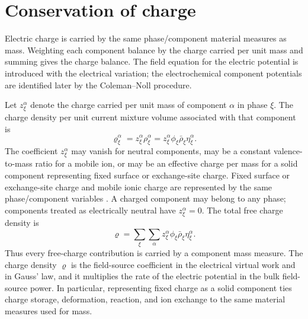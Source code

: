 \section{Conservation of charge}
\label{sec:conservation_of_charge}

Electric charge is carried by the same phase/component material measures as
mass.  Weighting each component balance by the charge carried per unit mass and
summing gives the charge balance.  The field equation for the electric
potential is introduced with the electrical variation; the electrochemical
component potentials are identified later by the Coleman--Noll procedure.

Let \(z_\xi^\alpha\) denote the charge carried per unit mass of component
\(\alpha\) in phase \(\xi\).  The charge density per unit current mixture volume
associated with that component is
%
\begin{equation}
	\varrho_\xi^\alpha
	=
	z_\xi^\alpha\rho_\xi^\alpha
	=
	z_\xi^\alpha\phi_\xi\bar\rho_\xi\eta_\xi^\alpha .
	\label{eq:component_charge_density_definition}
\end{equation}
%
The coefficient \(z_\xi^\alpha\) may vanish for neutral components, may be a
constant valence-to-mass ratio for a mobile ion, or may be an effective charge
per mass for a solid component representing fixed surface or exchange-site
charge.  Fixed surface or exchange-site charge and mobile ionic charge are
represented by the same phase/component variables
\cite{leroy2004triple,newman2004electrochemical}.  A charged component may
belong to any phase; components treated as electrically neutral have
\(z_\xi^\alpha=0\).  The total free charge density is
%
\begin{equation}
	\varrho
	=
	\sum_\xi\sum_\alpha
	z_\xi^\alpha\phi_\xi\bar\rho_\xi\eta_\xi^\alpha.
	\label{eq:mixture_charge_density_definition}
\end{equation}
%
Thus every free-charge contribution is carried by a component mass measure.
The charge density \(\varrho\) is the field-source coefficient in the
electrical virtual work and in Gauss' law, and it multiplies the rate of the
electric potential in the bulk field-source power.  In particular, representing
fixed charge as a solid component ties charge storage, deformation, reaction,
and ion exchange to the same material measures used for mass.

